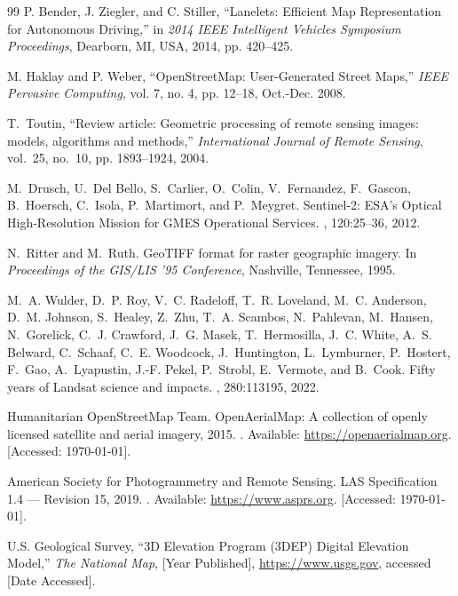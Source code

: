 \documentclass{book}
\begin{document}
\begin{thebibliography}{99}
P. Bender, J. Ziegler, and C. Stiller, ``Lanelets: Efficient Map Representation for Autonomous Driving,'' in \textit{2014 IEEE Intelligent Vehicles Symposium Proceedings}, Dearborn, MI, USA, 2014, pp. 420--425.

M. Haklay and P. Weber, ``OpenStreetMap: User-Generated Street Maps,'' \textit{IEEE Pervasive Computing}, vol. 7, no. 4, pp. 12--18, Oct.-Dec. 2008.

T.~Toutin, ``Review article: Geometric processing of remote sensing images: models, algorithms and methods,'' \emph{International Journal of Remote Sensing}, vol.~25, no.~10, pp. 1893--1924, 2004.

M.~Drusch, U.~Del Bello, S.~Carlier, O.~Colin, V.~Fernandez, F.~Gascon, B.~Hoersch, C.~Isola, P.~Martimort, and P.~Meygret.
\newblock Sentinel-2: ESA's Optical High-Resolution Mission for GMES Operational Services.
, 120:25--36, 2012.

N.~Ritter and M.~Ruth.
\newblock GeoTIFF format for raster geographic imagery.
\newblock In {\em Proceedings of the GIS/LIS '95 Conference}, Nashville, Tennessee, 1995.

M.~A. Wulder, D.~P. Roy, V.~C. Radeloff, T.~R. Loveland, M.~C. Anderson, D.~M. Johnson, S.~Healey, Z.~Zhu, T.~A. Scambos, N.~Pahlevan, M.~Hansen, N.~Gorelick, C.~J. Crawford, J.~G. Masek, T.~Hermosilla, J.~C. White, A.~S. Belward, C.~Schaaf, C.~E. Woodcock, J.~Huntington, L.~Lymburner, P.~Hostert, F.~Gao, A.~Lyapustin, J.-F. Pekel, P.~Strobl, E.~Vermote, and B.~Cook.
\newblock Fifty years of Landsat science and impacts.
, 280:113195, 2022.


Humanitarian OpenStreetMap Team.
\newblock OpenAerialMap: A collection of openly licensed satellite and aerial imagery, 2015.
\newblock [Online]. Available: \url{https://openaerialmap.org}. [Accessed: \today].

American Society for Photogrammetry and Remote Sensing.
\newblock LAS Specification 1.4 — Revision 15, 2019.
\newblock [Online]. Available: \url{https://www.asprs.org}. [Accessed: \today].

U.S. Geological Survey, 
\newblock ``3D Elevation Program (3DEP) Digital Elevation Model,'' 
\newblock \emph{The National Map}, [Year Published], 
\newblock \url{https://www.usgs.gov}, 
\newblock accessed [Date Accessed].


\end{thebibliography}
\end{document}
